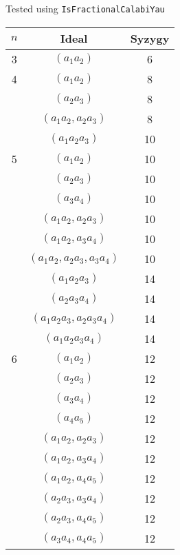 \documentclass{article}
\begin{document}
\begin{flushleft}
   \begin{center}
   \end{center}
   Tested using \texttt{IsFractionalCalabiYau}
   \begin{center}
      \begin{tabular}{|c|c|c|}
         \hline
         $n$ & Ideal & Syzygy \\
         \hline 
         3 & $(a_1a_2)$ & 6 \\
         \hline
         4 & $(a_1a_2)$ & 8 \\
         & $(a_2a_3)$ & 8 \\
         & $(a_1a_2, a_2a_3)$ & 8 \\
         & $(a_1a_2a_3)$ & 10 \\
         \hline
         5 & $(a_1a_2)$ & 10 \\
         & $(a_2a_3)$ & 10 \\
         & $(a_3a_4)$ & 10 \\
         & $(a_1a_2, a_2a_3)$ & 10 \\
         & $(a_1a_2, a_3a_4)$ & 10 \\
         & $(a_1a_2, a_2a_3, a_3a_4)$ & 10 \\
         & $(a_1a_2a_3)$ & 14 \\
         & $(a_2a_3a_4)$ & 14 \\
         & $(a_1a_2a_3, a_2a_3a_4)$ & 14 \\
         & $(a_1a_2a_3a_4)$ & 14 \\
         \hline
         6 & $(a_1a_2)$ & 12 \\
         & $(a_2a_3)$ & 12 \\
         & $(a_3a_4)$ & 12 \\
         & $(a_4a_5)$ & 12 \\
         & $(a_1a_2, a_2a_3)$ & 12 \\
         & $(a_1a_2, a_3a_4)$ & 12 \\
         & $(a_1a_2, a_4a_5)$ & 12 \\
         & $(a_2a_3, a_3a_4)$ & 12 \\
         & $(a_2a_3, a_4a_5)$ & 12 \\
         & $(a_3a_4, a_4a_5)$ & 12 \\
      \end{tabular}
   \end{center}
\end{flushleft}
\end{document}

